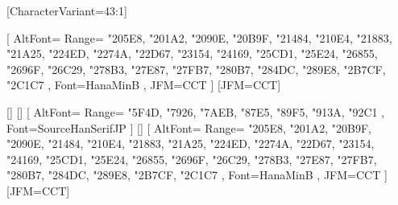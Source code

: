 \usepackage{hyperref}

\usepackage[disablejfam]{luatexja}
\usepackage{luatexja-fontspec}
\usepackage{luatexja-ruby}

\usepackage{expl3}
\usepackage{adjustbox}
\usepackage{calc}
\usepackage{fancyhdr}
\usepackage{ifthen}
\usepackage{mfirstuc}
\usepackage{multicol}
\usepackage{pdfcomment}
\usepackage{pxpic}
\usepackage{enumitem}
\usepackage{titlesec}
\usepackage{xparse}

\usepackage{geometry}

\setmainfont{Junicode}
\setfontfamily{}[CharacterVariant={43:1}]
\setfontfamily{}

%
% 

% 
[
  AltFont={
    {Range={
      "205E8, "201A2, "2090E, "20B9F,
      "21484, "210E4, "21883, "21A25,
      "224ED, "2274A, "22D67, "23154,
      "24169, "25CD1, "25E24, "26855,
      "2696F, "26C29, "278B3, "27E87,
      "27FB7, "280B7, "284DC, "289E8,
      "2B7CF, "2C1C7
    },
    Font=HanaMinB}
  },
  JFM=CCT
]
[JFM=CCT]

\newjfontfamily{}[]
\newjfontfamily{}[]
\newjfontfamily{}[
  AltFont={
    {Range={
      "5F4D, "7926, "7AEB, "87E5, "89F5, "913A, "92C1
    },
    Font=SourceHanSerifJP}
  }
]
\newjfontfamily{}[]
\newjfontfamily{}[
  AltFont={
    {Range={
      "205E8, "201A2, "20B9F, "2090E,
      "21484, "210E4, "21883, "21A25,
      "224ED, "2274A, "22D67, "23154,
      "24169, "25CD1, "25E24, "26855,
      "2696F, "26C29, "278B3, "27E87,
      "27FB7, "280B7, "284DC, "289E8,
      "2B7CF, "2C1C7
    },
    Font=HanaMinB}
  },
  JFM=CCT
]
\newjfontfamily{}[JFM=CCT]



